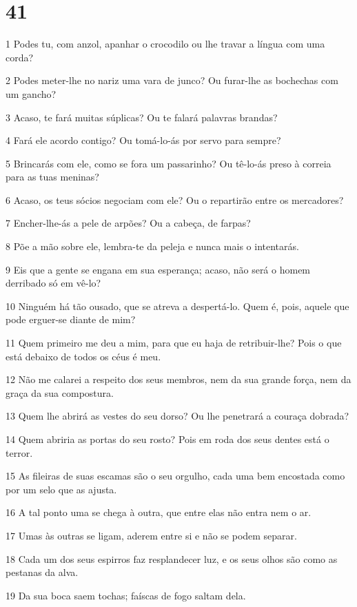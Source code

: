 \chapter{41}

\par 1 Podes tu, com anzol, apanhar o crocodilo ou lhe travar a língua com uma corda?
\par 2 Podes meter-lhe no nariz uma vara de junco? Ou furar-lhe as bochechas com um gancho?
\par 3 Acaso, te fará muitas súplicas? Ou te falará palavras brandas?
\par 4 Fará ele acordo contigo? Ou tomá-lo-ás por servo para sempre?
\par 5 Brincarás com ele, como se fora um passarinho? Ou tê-lo-ás preso à correia para as tuas meninas?
\par 6 Acaso, os teus sócios negociam com ele? Ou o repartirão entre os mercadores?
\par 7 Encher-lhe-ás a pele de arpões? Ou a cabeça, de farpas?
\par 8 Põe a mão sobre ele, lembra-te da peleja e nunca mais o intentarás.
\par 9 Eis que a gente se engana em sua esperança; acaso, não será o homem derribado só em vê-lo?
\par 10 Ninguém há tão ousado, que se atreva a despertá-lo. Quem é, pois, aquele que pode erguer-se diante de mim?
\par 11 Quem primeiro me deu a mim, para que eu haja de retribuir-lhe? Pois o que está debaixo de todos os céus é meu.
\par 12 Não me calarei a respeito dos seus membros, nem da sua grande força, nem da graça da sua compostura.
\par 13 Quem lhe abrirá as vestes do seu dorso? Ou lhe penetrará a couraça dobrada?
\par 14 Quem abriria as portas do seu rosto? Pois em roda dos seus dentes está o terror.
\par 15 As fileiras de suas escamas são o seu orgulho, cada uma bem encostada como por um selo que as ajusta.
\par 16 A tal ponto uma se chega à outra, que entre elas não entra nem o ar.
\par 17 Umas às outras se ligam, aderem entre si e não se podem separar.
\par 18 Cada um dos seus espirros faz resplandecer luz, e os seus olhos são como as pestanas da alva.
\par 19 Da sua boca saem tochas; faíscas de fogo saltam dela.
